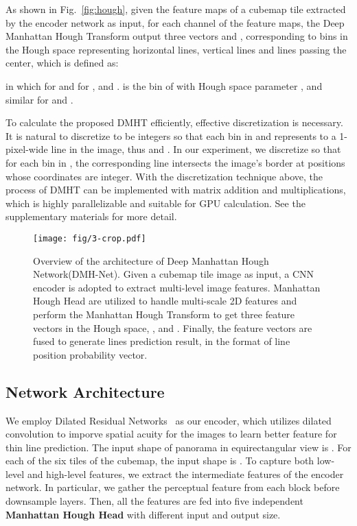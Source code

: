 \documentclass[runningheads]{llncs}
\begin{document}
As shown in Fig.~\ref{fig:hough}, given the feature maps of a cubemap tile extracted by the encoder network as input, for each channel  of the feature maps, the Deep Manhattan Hough Transform  output three vectors  and , corresponding to bins in the Hough space representing horizontal lines, vertical lines and lines passing the center, which is defined as:

in which  for  and  for , and .  is the bin of  with Hough space parameter , and similar for  and . 


To calculate the proposed DMHT efficiently, effective discretization is necessary. It is natural to discretize  to be integers so that each bin in  and  represents to a 1-pixel-wide line in the image, thus  and . In our experiment, we discretize  so that for each bin in , the corresponding line intersects the image's border at positions whose coordinates are integer. With the discretization technique above, the process of DMHT can be implemented with matrix addition and multiplications, which is highly parallelizable and suitable for GPU calculation. See the supplementary materials for more detail.

\begin{figure*}[!h]
	\centering
	\texttt{[image: fig/3-crop.pdf]}
	\caption{Overview of the architecture of Deep Manhattan Hough Network(DMH-Net). Given a cubemap tile image as input, a CNN encoder is adopted to extract multi-level image features. Manhattan Hough Head are utilized to handle multi-scale 2D features and perform the Manhattan Hough Transform to get three feature vectors in the Hough space, ,  and . Finally, the feature vectors are fused to generate lines prediction result, in the format of line position probability vector.
	}
	\label{fig:model} 
\end{figure*}

\subsection{Network Architecture}\label{sec:arch}
We employ Dilated Residual Networks~\cite{yu2017dilated,He_2016_ResNet} as our encoder, which utilizes dilated convolution to imporve spatial acuity for the images to learn better feature for thin line prediction. The input shape of panorama in equirectangular view  is .
For each of the six tiles of the cubemap, the input shape is .
To capture both low-level and high-level features, we extract the intermediate features of the encoder network. In particular, we gather the perceptual feature from each block before downsample layers. Then, all the features are fed into five independent \textbf{Manhattan Hough Head} with different input and output size. 
\end{document}
